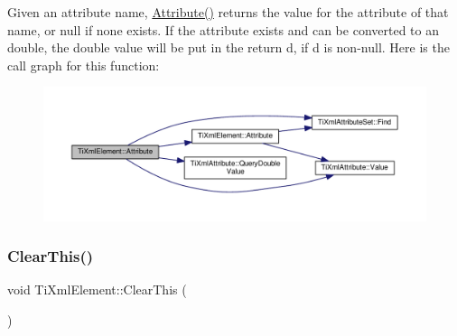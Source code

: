 Given an attribute name, \hyperlink{class_ti_xml_element_a6042f518748f475a7ac4b4e0b509eb05}{Attribute()} returns the value for the attribute of that name, or null if none exists. If the attribute exists and can be converted to an double, the double value will be put in the return \textquotesingle{}d\textquotesingle{}, if \textquotesingle{}d\textquotesingle{} is non-\/null. Here is the call graph for this function\+:
\nopagebreak
\begin{figure}[H]
\begin{center}
\leavevmode
\includegraphics[width=350pt]{class_ti_xml_element_a09df893402d0ab1402c8725e6d30ec04_cgraph}
\end{center}
\end{figure}
\mbox{\label{class_ti_xml_element_a5670933ec2d7d9763b9891acc05d7f7d}} 
\subsubsection{\texorpdfstring{Clear\+This()}{ClearThis()}}
{\footnotesize\ttfamily void Ti\+Xml\+Element\+::\+Clear\+This (\begin{DoxyParamCaption}{ }\end{DoxyParamCaption})\hspace{0.3cm}{\ttfamily [protected]}}

